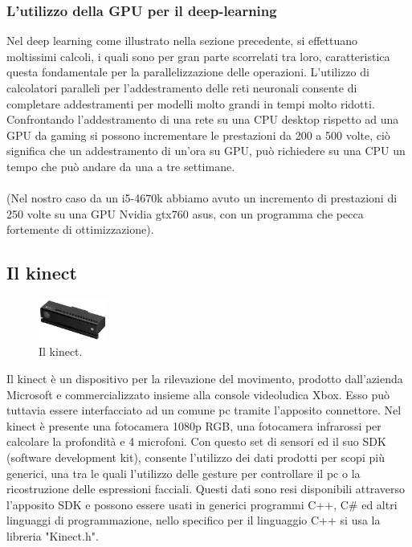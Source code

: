 \documentclass[10pt,a4paper]{article}
\begin{document}
\subsubsection{L'utilizzo della GPU per il deep-learning}
Nel deep learning come illustrato nella sezione precedente, si effettuano moltissimi calcoli, i quali sono per gran parte scorrelati tra loro, caratteristica questa fondamentale per la parallelizzazione delle operazioni.
L'utilizzo di calcolatori paralleli per l'addestramento delle reti neuronali consente di completare addestramenti per modelli molto grandi in tempi molto ridotti. Confrontando l'addestramento di una rete su una CPU desktop rispetto ad una GPU da gaming si possono incrementare le prestazioni da 200 a 500 volte, ciò significa che un addestramento di un'ora su GPU, può richiedere su una CPU un tempo che può andare da una a tre settimane. \\ \\
(Nel nostro caso da un i5-4670k abbiamo avuto un incremento di prestazioni di 250 volte su una GPU Nvidia gtx760 asus, con un programma che pecca fortemente di ottimizzazione).     



\subsection{Il kinect}

\begin{figure}
	\vspace{-10pt}
  	\centering
   	\includegraphics[width=0.2\textwidth]{kinect.jpg}
  	\vspace{-13pt}
  	\caption{Il kinect.}
  	\vspace{-10pt}
\end{figure}

Il kinect \`e un dispositivo per la rilevazione del movimento, prodotto dall'azienda Microsoft e commercializzato insieme alla console videoludica Xbox. Esso pu\`o tuttavia essere interfacciato ad un comune pc tramite l'apposito connettore. 
Nel kinect \`e presente una fotocamera 1080p RGB, una fotocamera infrarossi per calcolare la profondit\`a e 4 microfoni. Con questo set di sensori ed il suo SDK (software development kit), consente l'utilizzo dei dati prodotti per scopi pi\`u generici, una tra le quali l'utilizzo delle gesture per controllare il pc o la ricostruzione delle espressioni facciali. Questi dati sono resi disponibili attraverso l'apposito SDK e possono essere usati in generici programmi C++, C\# ed altri linguaggi di programmazione, nello specifico per il linguaggio C++ si usa la libreria "Kinect.h".
\end{document}
